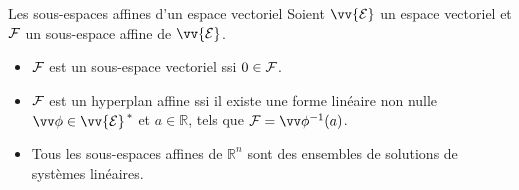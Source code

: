 \documentclass[
bigger]{m53beamer}
\begin{document}
  \begin{frame}{Les sous-espaces affines d'un espace vectoriel}
    Soient $\vv{\ens{E}}$ un espace vectoriel et $\mathcal{F}$ un sous-espace affine de $\vv{\ens{E}}$.
    \begin{itemize}[<+(1)->]
      \item $\mathcal{F}$ est un sous-espace vectoriel ssi $0 \in \mathcal{F}$.
      \item $\mathcal{F}$ est un hyperplan affine ssi il existe une forme linéaire non nulle $\vv\phi\in\vv{\ens{E}}^{\,*}$ et $a \in \mathbb{R}$, tels que $\ens{F}=\vv\phi^{-1}(a)$.
      \item Tous les sous-espaces affines de $\mathbb{R}^{n}$ sont des ensembles de solutions de systèmes linéaires.
    \end{itemize}
  \end{frame}
\end{document}
